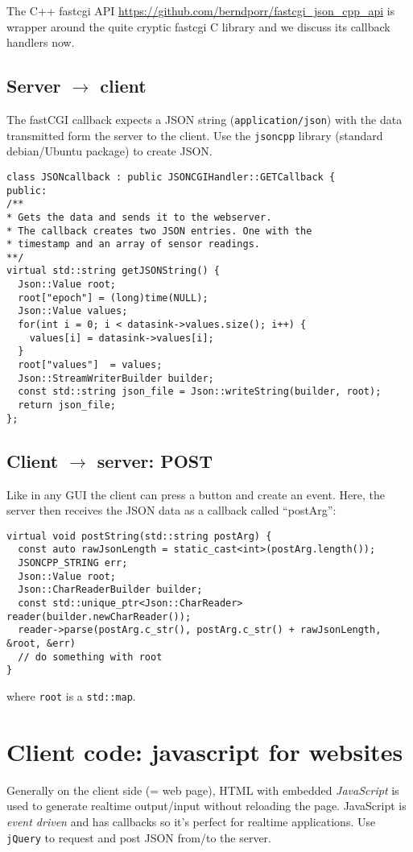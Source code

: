 \documentclass[12pt]{report}
\begin{document}
The C++ fastcgi API \url{https://github.com/berndporr/fastcgi_json_cpp_api} 
is wrapper around the quite cryptic fastcgi C library and we discuss
its callback handlers now.

\subsection{Server $\to$ client}
The fastCGI callback expects a JSON string (\texttt{application/json}) with the data
transmitted form the server to the client. Use the \texttt{jsoncpp} library (standard debian/Ubuntu package)
to create JSON.
\begin{verbatim}
class JSONcallback : public JSONCGIHandler::GETCallback {
public:
/**
* Gets the data and sends it to the webserver.
* The callback creates two JSON entries. One with the
* timestamp and an array of sensor readings.
**/
virtual std::string getJSONString() {
  Json::Value root;
  root["epoch"] = (long)time(NULL);
  Json::Value values;
  for(int i = 0; i < datasink->values.size(); i++) {
    values[i] = datasink->values[i];
  }
  root["values"]  = values;
  Json::StreamWriterBuilder builder;
  const std::string json_file = Json::writeString(builder, root);
  return json_file;
};
\end{verbatim} 

\subsection{Client $\to$ server: POST}
Like in any GUI the client can press a button and create an event.
Here, the server then receives the JSON data as a callback called ``postArg'':
\begin{verbatim}
virtual void postString(std::string postArg) {
  const auto rawJsonLength = static_cast<int>(postArg.length());
  JSONCPP_STRING err;
  Json::Value root;
  Json::CharReaderBuilder builder;
  const std::unique_ptr<Json::CharReader> reader(builder.newCharReader());
  reader->parse(postArg.c_str(), postArg.c_str() + rawJsonLength, &root, &err)
  // do something with root
}
\end{verbatim}
where \texttt{root} is a \texttt{std::map}.

\section{Client code: javascript for websites}
Generally on the client side (= web page), HTML with embedded
\textsl{JavaScript} is used to generate realtime output/input without
reloading the page. JavaScript is \textsl{event driven} and has
callbacks so it's perfect for realtime applications. Use
\texttt{jQuery} to request and post JSON from/to the server.
\end{document}
